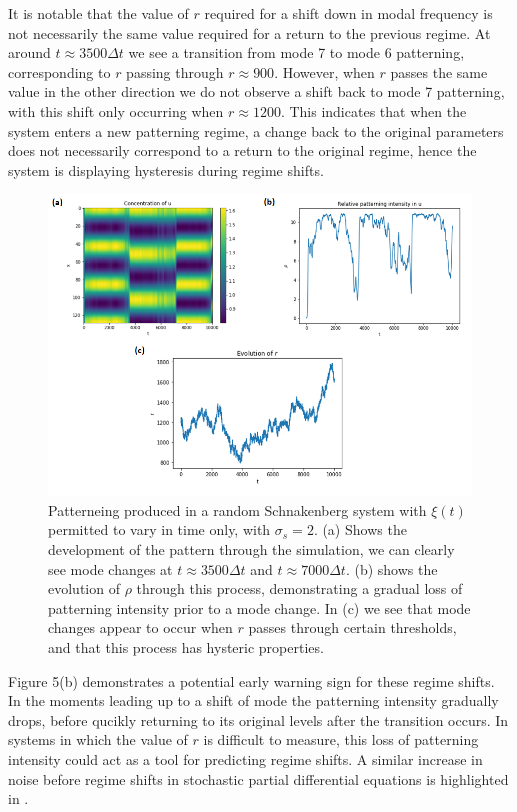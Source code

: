 \documentclass[12pt]{article}
\begin{document}
It is notable that the value of $r$ required for a shift down in modal frequency is not necessarily the same value required for a return to the previous regime. At around $t \approx 3500 \Delta t$ we see a transition from mode 7 to mode 6 patterning, corresponding to $r$ passing through $r \approx 900$. However, when $r$ passes the same value in the other direction we do not observe a shift back to mode 7 patterning, with this shift only occurring when $r \approx 1200$. This indicates that when the system enters a new patterning regime, a change back to the original parameters does not necessarily correspond to a return to the original regime, hence the system is displaying hysteresis during regime shifts.  
\begin{figure}
\begin{center}
  \includegraphics[scale = 0.75]{Fig_5.png}
  \caption{Patterneing produced in a random Schnakenberg system with $\xi(t)$ permitted to vary in time only, with $\sigma_s = 2$. (a) Shows the development of the pattern through the simulation, we can clearly see mode changes at $t \approx 3500\Delta t$ and $t \approx 7000\Delta t$. (b) shows the evolution of $\rho$ through this process, demonstrating a gradual loss of patterning intensity prior to a mode change. In (c) we see that mode changes appear to occur when $r$ passes through certain thresholds, and that this process has hysteric properties.}
  \end{center}
\end{figure}

Figure 5(b) demonstrates a potential early warning sign for these regime shifts. In the moments leading up to a shift of mode the patterning intensity gradually drops, before qucikly returning to its original levels after the transition occurs. In systems in which the value of $r$ is difficult to measure, this loss of patterning intensity could act as a tool for predicting regime shifts. A similar increase in noise before regime shifts in stochastic partial differential equations is highlighted in \cite{Gowda}. 
\end{document}
